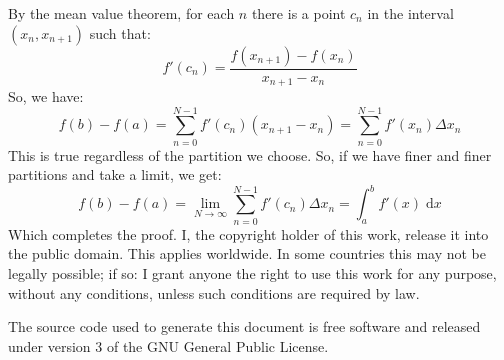 \documentclass{article}
\theoremstyle{normal}
\theoremstyle{plain}
\begin{document}
    By the mean value theorem, for each $n$ there is a point $c_{n}$ in the
    interval $(x_{n},x_{n+1})$ such that:
    \begin{equation}
        f'(c_{n})=\frac{f(x_{n+1})-f(x_{n})}{x_{n+1}-x_{n}}
    \end{equation}
    So, we have:
    \begin{equation}
        f(b)-f(a)=\sum_{n=0}^{N-1}f'(c_{n})(x_{n+1}-x_{n})
            =\sum_{n=0}^{N-1}f'(x_{n})\Delta{x}_{n}
    \end{equation}
    This is true regardless of the partition we choose. So, if we have finer
    and finer partitions and take a limit, we get:
    \begin{equation}
        f(b)-f(a)=\lim_{N\rightarrow\infty}
            \sum_{n=0}^{N-1}f'(c_{n})\Delta{x}_{n}
            =\int_{a}^{b}f'(x)\;\textrm{d}x
    \end{equation}
    Which completes the proof.
    \newpage
    I, the copyright holder of this work, release it into the public domain.
    This applies worldwide. In some countries this may not be legally possible;
    if so: I grant anyone the right to use this work for any purpose, without
    any conditions, unless such conditions are required by law.
    \par\hfill\par
    The source code used to generate this document is free software and released
    under version 3 of the GNU General Public License.
\end{document}
